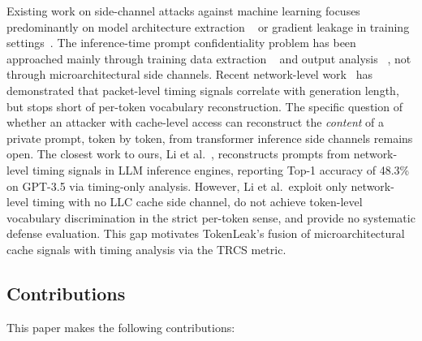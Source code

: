 \documentclass[journal,10pt,twocolumn]{IEEEtran}
\begin{document}
Existing work on side-channel attacks against machine learning
focuses predominantly on model architecture extraction
~\cite{batina2019csi,yan2020cache,stoian2024cachegrind,hong2023sok}
or gradient leakage in training settings~\cite{hong2023sok,chen2024llmthreat}. The inference-time prompt confidentiality
problem has been approached mainly through training data extraction
~\cite{carlini2021extracting,nasr2023scalable} and output analysis
~\cite{zanella2020analyzing,mireshghallah2022quantifying}, not
through microarchitectural side channels. Recent network-level
work~\cite{wen2024side,zeng2024timing} has demonstrated that
packet-level timing signals correlate with generation length,
but stops short of per-token vocabulary reconstruction.
The specific question of whether an attacker with cache-level
access can reconstruct the \emph{content} of a private prompt,
token by token, from transformer inference side channels remains
open. The closest work to ours, Li et al.~\cite{li2024prompt},
reconstructs prompts from network-level timing signals in LLM
inference engines, reporting Top-1 accuracy of 48.3\% on GPT-3.5
via timing-only analysis. However, Li et al.\ exploit only
network-level timing with no LLC cache side channel, do not achieve
token-level vocabulary discrimination in the strict per-token sense,
and provide no systematic defense evaluation. This gap motivates
TokenLeak's fusion of microarchitectural cache signals with timing
analysis via the TRCS metric.

\subsection*{Contributions}

This paper makes the following contributions:
\end{document}
